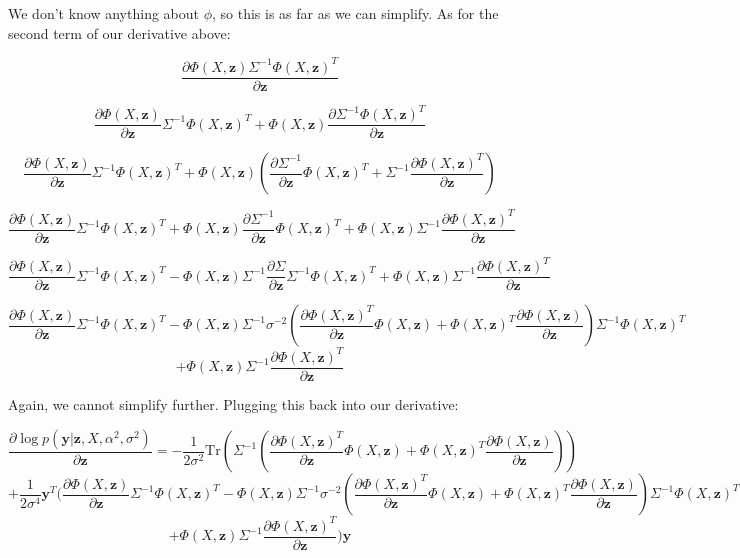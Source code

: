 \documentclass[11pt]{article}
\newcommand{\mbf}[1]{{\boldsymbol{\mathbf{#1}}}}
\renewcommand{\bm}{\mbf}
\newcommand{\Tr}{\textrm{Tr}}
\begin{document}
\begin{enumerate}
\begin{enumerate}[label=(\alph*)]
            We don't know anything about $\phi$, so this is as far as we can simplify. As for the second term of our derivative above:

            $$
            \dfrac{\partial \Phi(X, \bm{z}) \Sigma^{-1} \Phi(X, \bm{z})^T}{\partial \bm{z}}
            $$

            $$
            \dfrac{\partial \Phi(X, \bm{z})}{\partial \bm{z}} \Sigma^{-1} \Phi(X, \bm{z})^T + \Phi(X, \bm{z}) \dfrac{\partial \Sigma^{-1} \Phi(X, \bm{z})^T}{\partial \bm{z}}
            $$

            $$
            \dfrac{\partial \Phi(X, \bm{z})}{\partial \bm{z}} \Sigma^{-1} \Phi(X, \bm{z})^T + \Phi(X, \bm{z}) (\dfrac{\partial \Sigma^{-1}}{\partial \bm{z}} \Phi(X, \bm{z})^T + \Sigma^{-1} \dfrac{\partial \Phi(X, \bm{z})^T}{\partial \bm{z}})
            $$

            $$
            \dfrac{\partial \Phi(X, \bm{z})}{\partial \bm{z}} \Sigma^{-1} \Phi(X, \bm{z})^T + \Phi(X, \bm{z}) \dfrac{\partial \Sigma^{-1}}{\partial \bm{z}} \Phi(X, \bm{z})^T + \Phi(X, \bm{z}) \Sigma^{-1} \dfrac{\partial \Phi(X, \bm{z})^T}{\partial \bm{z}}
            $$

            $$
            \dfrac{\partial \Phi(X, \bm{z})}{\partial \bm{z}} \Sigma^{-1} \Phi(X, \bm{z})^T - \Phi(X, \bm{z}) \Sigma^{-1} \dfrac{\partial \Sigma}{\partial \bm{z}} \Sigma^{-1} \Phi(X, \bm{z})^T + \Phi(X, \bm{z}) \Sigma^{-1} \dfrac{\partial \Phi(X, \bm{z})^T}{\partial \bm{z}}
            $$

            $$
            \dfrac{\partial \Phi(X, \bm{z})}{\partial \bm{z}} \Sigma^{-1} \Phi(X, \bm{z})^T - \Phi(X, \bm{z}) \Sigma^{-1} \sigma^{-2} (\dfrac{\partial \Phi(X, \bm{z})^T}{\partial \bm{z}} \Phi(X, \bm{z}) + \Phi(X, \bm{z})^T \dfrac{\partial \Phi(X, \bm{z})}{\partial \bm{z}}) \Sigma^{-1} \Phi(X, \bm{z})^T$$$$ + \Phi(X, \bm{z}) \Sigma^{-1} \dfrac{\partial \Phi(X, \bm{z})^T}{\partial \bm{z}}
            $$

            Again, we cannot simplify further. Plugging this back into our derivative:

            $$
            \dfrac{\partial \log p(\bm{y}|\bm{z}, X, \alpha^2, \sigma^2)}{\partial \bm{z}} = - \dfrac{1}{2\sigma^2} \Tr(\Sigma^{-1} (\dfrac{\partial \Phi(X, \bm{z})^T}{\partial \bm{z}} \Phi(X, \bm{z}) + \Phi(X, \bm{z})^T \dfrac{\partial \Phi(X, \bm{z})}{\partial \bm{z}}))$$$$ + \dfrac{1}{2 \sigma^4} \bm{y}^T (\dfrac{\partial \Phi(X, \bm{z})}{\partial \bm{z}} \Sigma^{-1} \Phi(X, \bm{z})^T - \Phi(X, \bm{z}) \Sigma^{-1} \sigma^{-2} (\dfrac{\partial \Phi(X, \bm{z})^T}{\partial \bm{z}} \Phi(X, \bm{z}) + \Phi(X, \bm{z})^T \dfrac{\partial \Phi(X, \bm{z})}{\partial \bm{z}}) \Sigma^{-1} \Phi(X, \bm{z})^T$$$$ + \Phi(X, \bm{z}) \Sigma^{-1} \dfrac{\partial \Phi(X, \bm{z})^T}{\partial \bm{z}}) \bm{y}
            $$


\end{enumerate}
\end{enumerate}
\end{document}
